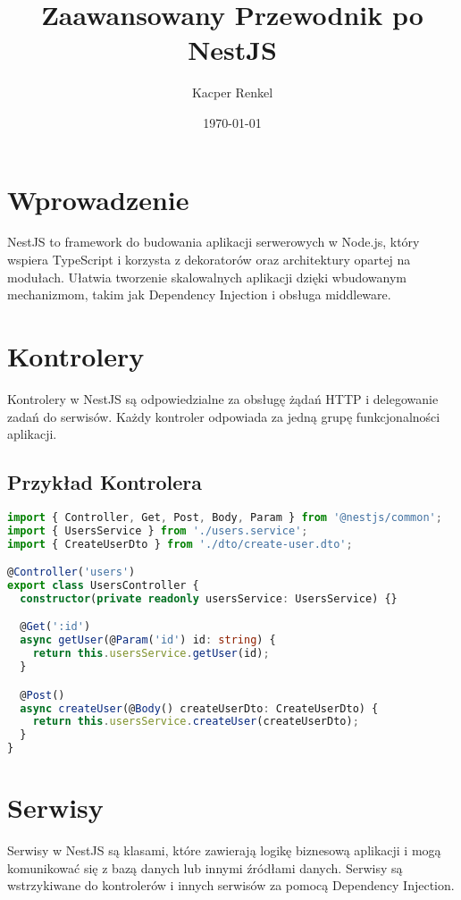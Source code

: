 \documentclass[a4paper,12pt]{article}
\title{Zaawansowany Przewodnik po NestJS}
\author{Kacper Renkel}
\date{\today}
\begin{document}
\maketitle

\tableofcontents
\newpage

\section{Wprowadzenie}
NestJS to framework do budowania aplikacji serwerowych w Node.js, który wspiera TypeScript i korzysta z dekoratorów oraz architektury opartej na modułach. Ułatwia tworzenie skalowalnych aplikacji dzięki wbudowanym mechanizmom, takim jak Dependency Injection i obsługa middleware.

\section{Kontrolery}
Kontrolery w NestJS są odpowiedzialne za obsługę żądań HTTP i delegowanie zadań do serwisów. Każdy kontroler odpowiada za jedną grupę funkcjonalności aplikacji.

\subsection{Przykład Kontrolera}
\begin{lstlisting}[language=TypeScript, caption=Przykład kontrolera w NestJS]
import { Controller, Get, Post, Body, Param } from '@nestjs/common';
import { UsersService } from './users.service';
import { CreateUserDto } from './dto/create-user.dto';

@Controller('users')
export class UsersController {
  constructor(private readonly usersService: UsersService) {}

  @Get(':id')
  async getUser(@Param('id') id: string) {
    return this.usersService.getUser(id);
  }

  @Post()
  async createUser(@Body() createUserDto: CreateUserDto) {
    return this.usersService.createUser(createUserDto);
  }
}
\end{lstlisting}

\section{Serwisy}
Serwisy w NestJS są klasami, które zawierają logikę biznesową aplikacji i mogą komunikować się z bazą danych lub innymi źródłami danych. Serwisy są wstrzykiwane do kontrolerów i innych serwisów za pomocą Dependency Injection.
\end{document}
